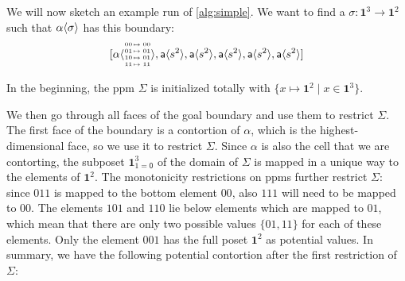 \documentclass[11pt]{article}
\theoremstyle{definition}
\newcommand{\continuation}{??}
\newenvironment{examplecontd}[1]
{\renewcommand{\continuation}{\ref{#1}}\expcont[continued]}
{\endexpcont}
\newcommand{\mlist}[1]{[ {#1} ]}
\newcommand{\pint}[1]{\mathbf{1}^{#1}}
\newcommand{\pintrestr}[3]{\mathbf{1}^{#1}_{{#2}={#3}}}
\newcommand{\izero}{\mathsf{0}}
\newcommand{\smap}[1]{s^{{#1}}}
\newcommand{\cont}[2]{\ensuremath{ \ifthenelse{\equal{#2}{}}{#1}{{#1}\langle{#2}\rangle}} }
\newcommand{\cset}[1]{\ensuremath{\mathsf{{#1}}}}
\newcommand{\substfour}[4]{\tiny
  \arraycolsep=.4pt\def\arraystretch{1}
  \begin{array}{ll}
    00 &\mapsto {#1} \\
    01 &\mapsto {#2} \\
    10 &\mapsto {#3} \\
    11 &\mapsto {#4} 
  \end{array}
}
\begin{document}
\begin{examplecontd}{exp:sndsphere}

  We will now sketch an example run of \autoref{alg:simple}. We want to find a
  $\sigma : \pint{3} \to \pint{2}$ such that $\cont{\alpha}{\sigma}$ has this boundary:
$$\mlist{ \cont{\cset{\alpha}}{\substfour{00}{01}{01}{11}} ,
  \cont{\cset{a}}{\smap{2}} , \cont{\cset{a}}{\smap{2}} ,
  \cont{\cset{a}}{\smap{2}} , \cont{\cset{a}}{\smap{2}} ,
  \cont{\cset{a}}{\smap{2}}}$$

In the beginning, the ppm $\Sigma$ is initialized totally with $\{ x \mapsto
\pint{2} \mid x \in \pint{3}\}$.

We then go through all faces of the goal boundary and use them to restrict
$\Sigma$.
The first face of the boundary is a contortion of $\alpha$, which is the
highest-dimensional face, so we use it to restrict $\Sigma$. Since $\alpha$ is also
the cell that we are contorting, the subposet $\pintrestr{3}{1}{\izero}$
of the domain of $\Sigma$
is mapped in a unique way to the elements of $\pint{2}$. The monotonicity
restrictions on ppms further restrict $\Sigma$: since $011$ is mapped to the
bottom element $00$, also $111$ will need to be mapped to $00$. The elements
$101$ and $110$ lie below elements which are mapped to $01$, which mean that
there are only two possible values $\{01, 11\}$ for each of these elements. Only
the element $001$ has the full poset $\pint{2}$ as potential values. In summary,
we have the following potential contortion after the first restriction of $\Sigma$:

\begin{center}
\end{center}
\end{examplecontd}
\end{document}
